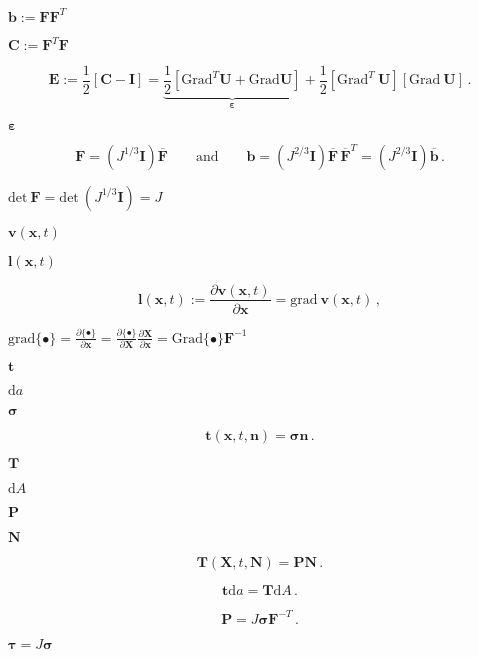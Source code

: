 \documentclass{article}
\begin{document}
$\mathbf{b} := \mathbf{F}\mathbf{F}^T$
\pagebreak

$\mathbf{C} := \mathbf{F}^T\mathbf{F}$
\pagebreak

\[ \mathbf{E}:= \frac{1}{2}[\mathbf{C} - \mathbf{I} ] = \underbrace{\frac{1}{2}[\textrm{Grad}^T \mathbf{U} + \textrm{Grad}\mathbf{U}]}_{\boldsymbol{\varepsilon}} + \frac{1}{2}[\textrm{Grad}^T\ \mathbf{U}][\textrm{Grad}\ \mathbf{U}] \, . \]
\pagebreak

$\boldsymbol{\varepsilon}$
\pagebreak

\[ \mathbf{F} = (J^{1/3}\mathbf{I})\overline{\mathbf{F}} \qquad \text{and} \qquad \mathbf{b} = (J^{2/3}\mathbf{I})\overline{\mathbf{F}}\,\overline{\mathbf{F}}^T = (J^{2/3}\mathbf{I})\overline{\mathbf{b}} \, . \]
\pagebreak

$\textrm{det}\ \mathbf{F} = \textrm{det}\ (J^{1/3}\mathbf{I}) = J$
\pagebreak

$\mathbf{v}(\mathbf{x},t)$
\pagebreak

$\mathbf{l}(\mathbf{x},t)$
\pagebreak

\[ \mathbf{l}(\mathbf{x},t) := \dfrac{\partial \mathbf{v}(\mathbf{x},t)}{\partial \mathbf{x}} = \textrm{grad}\ \mathbf{v}(\mathbf{x},t) \, , \]
\pagebreak

$\textrm{grad} \{\bullet \} = \frac{\partial \{ \bullet \} }{ \partial \mathbf{x}} = \frac{\partial \{ \bullet \} }{ \partial \mathbf{X}}\frac{\partial \mathbf{X} }{ \partial \mathbf{x}} = \textrm{Grad} \{ \bullet \} \mathbf{F}^{-1}$
\pagebreak

$\mathbf{t}$
\pagebreak

$\mathrm{d}a$
\pagebreak

$\boldsymbol{\sigma}$
\pagebreak

\[ \mathbf{t}(\mathbf{x},t, \mathbf{n}) = \boldsymbol{\sigma}\mathbf{n} \, . \]
\pagebreak

$\mathbf{T}$
\pagebreak

$\mathrm{d}A$
\pagebreak

$\mathbf{P}$
\pagebreak

$\mathbf{N}$
\pagebreak

\[ \mathbf{T}(\mathbf{X},t, \mathbf{N}) = \mathbf{P}\mathbf{N} \, . \]
\pagebreak

\[ \mathbf{t}\mathrm{d}a = \mathbf{T}\mathrm{d}A \, . \]
\pagebreak

\[ \mathbf{P} = J \boldsymbol{\sigma}\mathbf{F}^{-T} \, . \]
\pagebreak

$\boldsymbol{\tau} = J \boldsymbol{\sigma}$
\pagebreak
\end{document}
